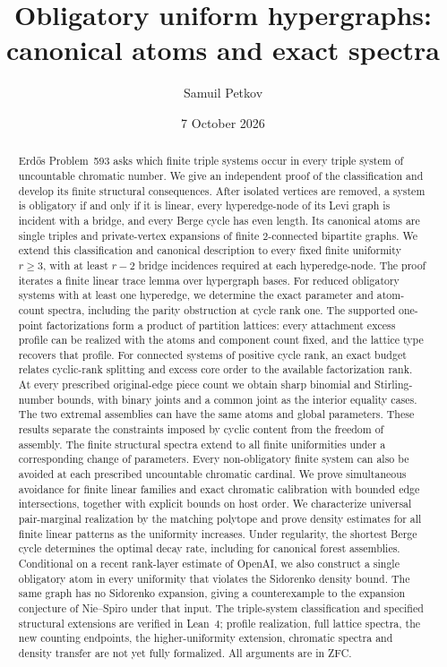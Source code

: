 \documentclass[a4paper,11pt,reqno]{amsart}
\title[Obligatory uniform hypergraphs]{Obligatory uniform hypergraphs: canonical atoms and exact spectra}
\author{Samuil Petkov}
\date{7 October 2026}
\theoremstyle{plain}
\theoremstyle{definition}
\theoremstyle{remark}
\begin{document}
\begin{abstract}
Erdős Problem~593 asks which finite triple systems occur in every triple
system of uncountable chromatic number.  We give an independent proof of the
classification and develop its finite structural consequences.  After
isolated vertices are removed, a system is obligatory if and only if it is
linear, every hyperedge-node of its Levi graph is incident with a bridge,
and every Berge cycle has even length.  Its canonical atoms are single
triples and private-vertex expansions of finite $2$-connected bipartite
graphs.  We extend this classification and canonical description to every
fixed finite uniformity $r\ge3$, with at least $r-2$ bridge incidences
required at each hyperedge-node.  The proof iterates a finite linear trace
lemma over hypergraph bases.  For reduced obligatory systems with at least one hyperedge, we
determine the exact parameter and atom-count spectra, including the parity
obstruction at cycle rank one.  The supported one-point factorizations form
a product of partition lattices: every attachment excess profile can be
realized with the atoms and component count fixed, and the lattice type
recovers that profile.  For connected systems of positive cycle rank, an
exact budget relates cyclic-rank splitting and excess core order to the
available factorization rank.  At every prescribed original-edge piece
count we obtain sharp binomial and Stirling-number bounds, with binary
joints and a common joint as the interior equality cases.  The two
extremal assemblies can have the same atoms and global parameters.
These results separate the constraints imposed by cyclic content from
the freedom of assembly.  The finite structural spectra extend to all
finite uniformities under a corresponding change of parameters.  Every
non-obligatory finite system can also be avoided at each prescribed
uncountable chromatic cardinal.  We prove simultaneous avoidance for
finite linear families and exact chromatic calibration with bounded
edge intersections, together with explicit bounds on host order.
We characterize universal pair-marginal realization by the matching
polytope and prove density estimates for all finite linear
patterns as the uniformity increases.  Under regularity, the
shortest Berge cycle determines the optimal decay rate, including
for canonical forest assemblies.
Conditional on a recent rank-layer estimate of OpenAI, we also
construct a single obligatory atom in every uniformity that violates
the Sidorenko density bound.  The same graph has no Sidorenko
expansion, giving a counterexample to the expansion conjecture of
Nie--Spiro under that input.  The
triple-system classification and specified structural extensions are
verified in Lean~4; profile realization, full lattice spectra, the new
counting endpoints, the higher-uniformity extension, chromatic
spectra and density transfer are not yet fully formalized.
All arguments are in ZFC.
\end{abstract}
\end{document}
